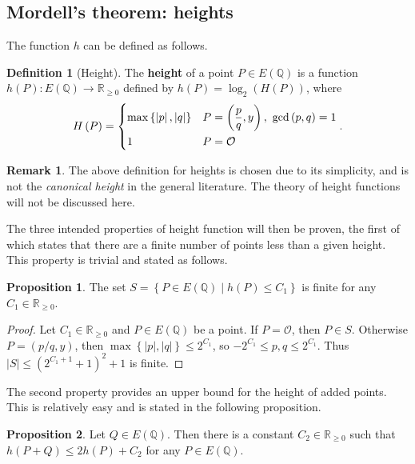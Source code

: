 \documentclass{article}
\newcommand{\Q}{\mathbb{Q}}
\newcommand{\R}{\mathbb{R}}
\newcommand{\rb}[1]{\left( #1 \right)}
\newcommand{\cb}[1]{\left\{ #1 \right\}}
\newcommand{\abs}[1]{\left\lvert #1 \right\rvert}
\theoremstyle{definition}
\newtheorem*{definition}{Definition}
\newtheorem*{remark}{Remark}
\newtheorem{proposition}{Proposition}[subsection]
\begin{document}
\pagebreak

\subsection{Mordell's theorem: heights}

The function $ h $ can be defined as follows.

\begin{definition}[Height]
The \textbf{height} of a point $ P \in E\rb{\Q} $ is a function $ h\rb{P} : E\rb{\Q} \to \R_{\ge 0} $ defined by $ h\rb{P} = \log_2\rb{H\rb{P}} $, where
$$ H\rb{P} = \begin{dcases} \max\cb{\abs{p}, \abs{q}} & P = \rb{\dfrac{p}{q}, y}, \ \gcd\rb{p, q} = 1 \\ 1 & P = \mathcal{O} \end{dcases}. $$
\end{definition}

\begin{remark}
The above definition for heights is chosen due to its simplicity, and is not the \emph{canonical height} in the general literature. The theory of height functions will not be discussed here.
\end{remark}

The three intended properties of height function will then be proven, the first of which states that there are a finite number of points less than a given height. This property is trivial and stated as follows.

\begin{proposition}
\label{prop:finiteness}
The set $ S = \cb{P \in E\rb{\Q} \mid h\rb{P} \le C_1} $ is finite for any $ C_1 \in \R_{\ge 0} $.
\end{proposition}

\begin{proof}
Let $ C_1 \in \R_{\ge 0} $ and $ P \in E\rb{\Q} $ be a point. If $ P = \mathcal{O} $, then $ P \in S $. Otherwise $ P = \rb{p / q, y} $, then $ \max\cb{\abs{p}, \abs{q}} \le 2^{C_1} $, so $ -2^{C_1} \le p, q \le 2^{C_1} $. Thus $ \abs{S} \le \rb{2^{C_1 + 1} + 1}^2 + 1 $ is finite.
\end{proof}

The second property provides an upper bound for the height of added points. This is relatively easy and is stated in the following proposition.

\begin{proposition}
\label{prop:upperbound}
Let $ Q \in E\rb{\Q} $. Then there is a constant $ C_2 \in \R_{\ge 0} $ such that $ h\rb{P + Q} \le 2h\rb{P} + C_2 $ for any $ P \in E\rb{\Q} $.
\end{proposition}
\end{document}
